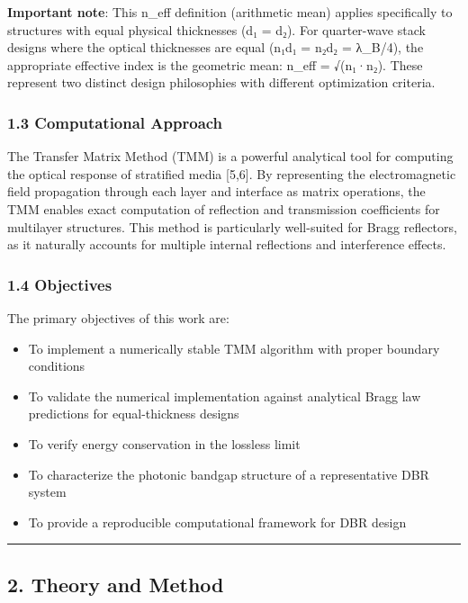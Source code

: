 \documentclass[
]{article}
\providecommand{\tightlist}{%
  \setlength{\itemsep}{0pt}\setlength{\parskip}{0pt}}
\begin{document}
\textbf{Important note}: This n\_eff definition (arithmetic mean)
applies specifically to structures with equal physical thicknesses (d₁ =
d₂). For quarter-wave stack designs where the optical thicknesses are
equal (n₁d₁ = n₂d₂ = λ\_B/4), the appropriate effective index is the
geometric mean: n\_eff = √(n₁·n₂). These represent two distinct design
philosophies with different optimization criteria.

\subsubsection{1.3 Computational Approach}\label{computational-approach}

The Transfer Matrix Method (TMM) is a powerful analytical tool for
computing the optical response of stratified media {[}5,6{]}. By
representing the electromagnetic field propagation through each layer
and interface as matrix operations, the TMM enables exact computation of
reflection and transmission coefficients for multilayer structures. This
method is particularly well-suited for Bragg reflectors, as it naturally
accounts for multiple internal reflections and interference effects.

\subsubsection{1.4 Objectives}\label{objectives}

The primary objectives of this work are:

\begin{itemize}
\tightlist
\item
  To implement a numerically stable TMM algorithm with proper boundary
  conditions
\item
  To validate the numerical implementation against analytical Bragg law
  predictions for equal-thickness designs
\item
  To verify energy conservation in the lossless limit
\item
  To characterize the photonic bandgap structure of a representative DBR
  system
\item
  To provide a reproducible computational framework for DBR design
\end{itemize}

\begin{center}\rule{0.5\linewidth}{0.5pt}\end{center}

\subsection{2. Theory and Method}\label{theory-and-method}
\end{document}
